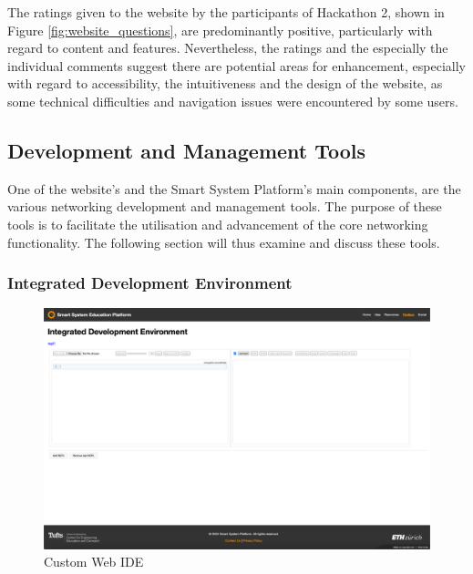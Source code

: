 The ratings given to the website by the participants of Hackathon 2, shown in Figure \ref{fig:website_questions}, are predominantly positive, particularly with regard to content and features. Nevertheless, the ratings and the especially the individual comments suggest there are potential areas for enhancement, especially with regard to accessibility, the intuitiveness and the design of the website, as some technical difficulties and navigation issues were encountered by some users.

\subsection{\label{sec:res_tools}Development and Management Tools}

One of the website's and the Smart System Platform's main components, are the various networking development and management tools. The purpose of these tools is to facilitate the utilisation and advancement of the core networking functionality. The following section will thus examine and discuss these tools.

\subsubsection{\label{sec:res_ide}Integrated Development Environment}

\begin{figure}[H]
    \centering
    \includegraphics[width=\linewidth]{overleaf/images/ide_raw.png}
    \vspace{\ftspace}
    \caption{Custom Web IDE}
    \vspace{\ftspace}
    \label{fig:ide_raw}
\end{figure}

